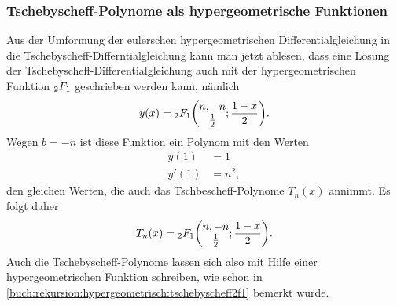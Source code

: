 \subsubsection{Tschebyscheff-Polynome als hypergeometrische Funktionen}
Aus der Umformung der eulerschen hypergeometrischen Differentialgleichung
in die Tschebyscheff-Differntialgleichung kann man jetzt ablesen, dass
eine Lösung der Tschebyscheff-Differentialgleichung auch mit der
hypergeometrischen Funktion $\mathstrut_2F_1$ geschrieben werden kann,
nämlich
\[
y(x)
=
\mathstrut_2F_1\biggl(
\begin{matrix}
n,-n\\
\frac12
\end{matrix};\frac{1-x}2
\biggr).
\]
Wegen $b=-n$ ist diese Funktion ein Polynom mit den Werten
\[
\begin{aligned}
y(1) &= 1 \\
y'(1)&= n^2,
\end{aligned}
\]
den gleichen Werten, die auch das Tschbescheff-Polynome $T_n(x)$ annimmt.
Es folgt daher
\begin{equation}
T_n(x)
=
\mathstrut_2F_1\biggl(
\begin{matrix}n,-n\\\frac12\end{matrix};
\frac{1-x}2
\biggr).
\end{equation}
Auch die Tschebyscheff-Polynome lassen sich also mit Hilfe einer
hypergeometrischen Funktion schreiben, wie schon in
\eqref{buch:rekursion:hypergeometrisch:tschebyscheff2f1}
bemerkt wurde.

